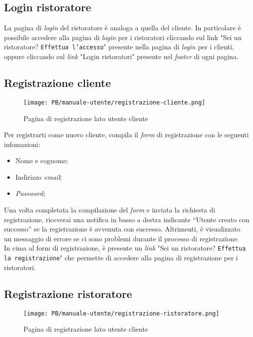 \subsection{Login ristoratore}

La pagina di \textit{login} del ristoratore è analoga a quella del cliente. In
particolare è possibile accedere alla pagina di \textit{login} per i ristoratori 
cliccando sul link "Sei un ristoratore? \texttt{Effettua l'accesso}" presente 
nella pagina di \textit{login} per i clienti, oppure cliccando sul \textit{link} 
"Login ristoratori" presente nel \textit{footer} di ogni pagina.

\subsection{Registrazione cliente}

\begin{figure}[htbp]
    \centering
	\texttt{[image: PB/manuale-utente/registrazione-cliente.png]}
    \caption{Pagina di registrazione lato utente cliente}
\end{figure}

Per registrarti come nuovo cliente, compila il \textit{form} di registrazione con le
seguenti infomazioni:

\begin{itemize}
	\item Nome e cognome;
	\item Indirizzo \textit{email};
	\item \textit{Password};
\end{itemize}

Una volta completata la compilazione del \textit{form} e inviata la richiesta di registrazione, riceverai 
una notifica in basso a destra indicante 
``Utente creato con successo'' se la registrazione è avvenuta con successo.
Altrimenti, è visualizzato un messaggio di errore se ci sono problemi durante il
processo di registrazione.\\
In cima al form di registrazione, è presente un \textit{link} "Sei un ristoratore?
\texttt{Effettua la registrazione}" che permette di accedere alla pagina di
registrazione per i ristoratori.

\newpage
\subsection{Registrazione ristoratore}

\begin{figure}[htbp]
    \centering
	\texttt{[image: PB/manuale-utente/registrazione-ristoratore.png]}
    \caption{Pagina di registrazione lato utente cliente}
\end{figure}

